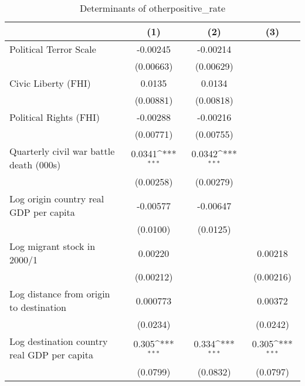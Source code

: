 \begin{table}[htbp]\centering
\def\sym#1{\ifmmode^{#1}\else\(^{#1}\)\fi}
\caption{Determinants of otherpositive\_rate}
\begin{tabular}{l*{3}{c}}
\hline\hline
                    &\multicolumn{1}{c}{(1)}         &\multicolumn{1}{c}{(2)}         &\multicolumn{1}{c}{(3)}         \\
\hline
Political Terror Scale&    -0.00245         &    -0.00214         &                     \\
                    &   (0.00663)         &   (0.00629)         &                     \\
[1em]
Civic Liberty (FHI) &      0.0135         &      0.0134         &                     \\
                    &   (0.00881)         &   (0.00818)         &                     \\
[1em]
Political Rights (FHI)&    -0.00288         &    -0.00216         &                     \\
                    &   (0.00771)         &   (0.00755)         &                     \\
[1em]
Quarterly civil war battle death (000s)&      0.0341\sym{***}&      0.0342\sym{***}&                     \\
                    &   (0.00258)         &   (0.00279)         &                     \\
[1em]
Log origin country real GDP per capita&    -0.00577         &    -0.00647         &                     \\
                    &    (0.0100)         &    (0.0125)         &                     \\
[1em]
Log migrant stock in 2000/1&     0.00220         &                     &     0.00218         \\
                    &   (0.00212)         &                     &   (0.00216)         \\
[1em]
Log distance from origin to destination&    0.000773         &                     &     0.00372         \\
                    &    (0.0234)         &                     &    (0.0242)         \\
[1em]
Log destination country real GDP per capita&       0.305\sym{***}&       0.334\sym{***}&       0.305\sym{***}\\
                    &    (0.0799)         &    (0.0832)         &    (0.0797)         \\

\end{tabular}
\end{table}
